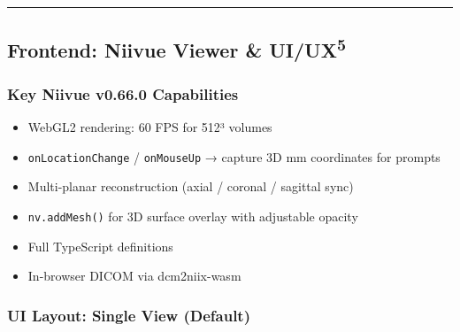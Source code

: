 \documentclass[
  11pt,
]{article}
\providecommand{\tightlist}{%
  \setlength{\itemsep}{0pt}\setlength{\parskip}{0pt}}
\begin{document}
\begin{center}\rule{0.5\linewidth}{0.5pt}\end{center}

\subsection{\texorpdfstring{Frontend: Niivue Viewer \&
UI/UX\textsuperscript{5}}{Frontend: Niivue Viewer \& UI/UX5}}\label{frontend-niivue-viewer-uiux-niivue2024}

\subsubsection{Key Niivue v0.66.0
Capabilities}\label{key-niivue-v0.66.0-capabilities}

\begin{itemize}
\tightlist
\item
  WebGL2 rendering: 60 FPS for 512³ volumes
\item
  \texttt{onLocationChange} / \texttt{onMouseUp} → capture 3D mm
  coordinates for prompts
\item
  Multi-planar reconstruction (axial / coronal / sagittal sync)
\item
  \texttt{nv.addMesh()} for 3D surface overlay with adjustable opacity
\item
  Full TypeScript definitions
\item
  In-browser DICOM via dcm2niix-wasm
\end{itemize}

\subsubsection{UI Layout: Single View
(Default)}\label{ui-layout-single-view-default}
\end{document}
